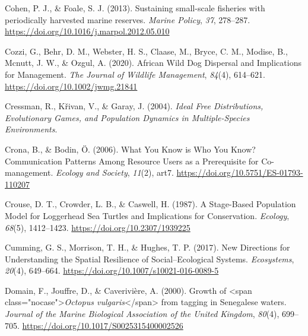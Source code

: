 \documentclass[
  12pt,
]{article}
\newlength{\cslhangindent}
\newlength{\cslentryspacingunit} %
\newenvironment{CSLReferences}[2] %
 {%
  \setlength{\parindent}{0pt}
  \ifodd #1
  \let\oldpar\par
  \def\par{\hangindent=\cslhangindent\oldpar}
  \fi
  \setlength{\parskip}{#2\cslentryspacingunit}
 }%
 {}
\begin{document}
\begin{CSLReferences}{1}{2}
\leavevmode{}%
Cohen, P. J., \& Foale, S. J. (2013). Sustaining small-scale fisheries with periodically harvested marine reserves. \emph{Marine Policy}, \emph{37}, 278--287. \url{https://doi.org/10.1016/j.marpol.2012.05.010}

\leavevmode{}%
Cozzi, G., Behr, D. M., Webster, H. S., Claase, M., Bryce, C. M., Modise, B., Mcnutt, J. W., \& Ozgul, A. (2020). African {Wild} {Dog} {Dispersal} and {Implications} for {Management}. \emph{The Journal of Wildlife Management}, \emph{84}(4), 614--621. \url{https://doi.org/10.1002/jwmg.21841}

\leavevmode{}%
Cressman, R., Křivan, V., \& Garay, J. (2004). \emph{Ideal {Free} {Distributions}, {Evolutionary} {Games}, and {Population} {Dynamics} in {Multiple}-{Species} {Environments}}.

\leavevmode{}%
Crona, B., \& Bodin, Ö. (2006). What {You} {Know} is {Who} {You} {Know}? {Communication} {Patterns} {Among} {Resource} {Users} as a {Prerequisite} for {Co}-management. \emph{Ecology and Society}, \emph{11}(2), art7. \url{https://doi.org/10.5751/ES-01793-110207}

\leavevmode{}%
Crouse, D. T., Crowder, L. B., \& Caswell, H. (1987). A {Stage}-{Based} {Population} {Model} for {Loggerhead} {Sea} {Turtles} and {Implications} for {Conservation}. \emph{Ecology}, \emph{68}(5), 1412--1423. \url{https://doi.org/10.2307/1939225}

\leavevmode{}%
Cumming, G. S., Morrison, T. H., \& Hughes, T. P. (2017). New {Directions} for {Understanding} the {Spatial} {Resilience} of {Social}--{Ecological} {Systems}. \emph{Ecosystems}, \emph{20}(4), 649--664. \url{https://doi.org/10.1007/s10021-016-0089-5}

\leavevmode{}%
Domain, F., Jouffre, D., \& Caverivière, A. (2000). Growth of {\textless{}}span class="nocase"{\textgreater{}}\emph{{Octopus} vulgaris}{\textless{}}/span{\textgreater{}} from tagging in {Senegalese} waters. \emph{Journal of the Marine Biological Association of the United Kingdom}, \emph{80}(4), 699--705. \url{https://doi.org/10.1017/S0025315400002526}


\end{CSLReferences}
\end{document}
